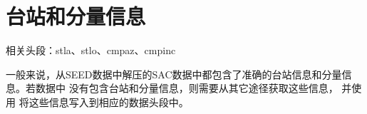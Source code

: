 \section{台站和分量信息}
相关头段：stla、stlo、cmpaz、cmpinc

一般来说，从SEED数据中解压的SAC数据中都包含了准确的台站信息和分量信息。若数据中
没有包含台站和分量信息，则需要从其它途径获取这些信息，
并使用  将这些信息写入到相应的数据头段中。
